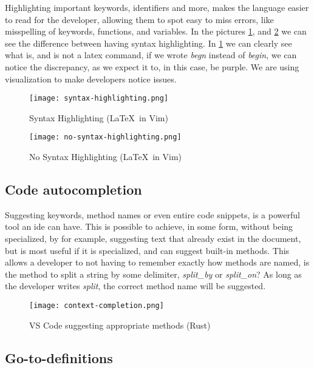 Highlighting important keywords, identifiers and more, makes the language easier
to read for the developer, allowing them to spot easy to miss errors, like
misspelling of keywords, functions, and variables. In the pictures
\ref{pic:stx}, and \ref{pic:noStx} we can see the difference between having
syntax highlighting. In \ref{pic:stx} we can clearly see what is, and is not a
latex command, if we wrote \textit{begn} instead of \textit{begin}, we can
notice the discrepancy, as we expect it to, in this case, be purple. We are
using visualization to make developers notice issues.

\begin{figure}
  \centering
  \texttt{[image: syntax-highlighting.png]}
  \caption{Syntax Highlighting (\LaTeX\ in Vim)}
  \label{pic:stx}
\end{figure}

\begin{figure}
  \centering
  \texttt{[image: no-syntax-highlighting.png]}
  \caption{No Syntax Highlighting (\LaTeX\ in Vim)}
  \label{pic:noStx}
\end{figure}

\subsection{Code autocompletion}

Suggesting keywords, method names or even entire code snippets, is a powerful
tool an \gls*{ide} can have. This is possible to achieve, in some form, without
being specialized, by for example, suggesting text that already exist in the
document, but is most useful if it is specialized, and can suggest built-in
methods. This allows a developer to not having to remember exactly how methods
are named, is the method to split a string by some delimiter, \textit{split\_by}
or \textit{split\_on}? As long as the developer writes \textit{split}, the
correct method name will be suggested.

\begin{figure}
  \centering
  \texttt{[image: context-completion.png]}
  \caption{VS Code suggesting appropriate methods (Rust)}
  \label{pic:completion}
\end{figure}

\subsection{Go-to-definitions}

